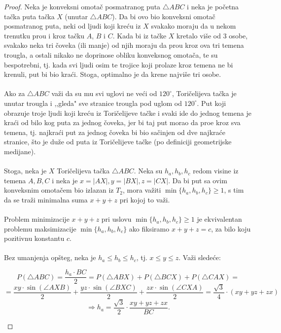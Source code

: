 \documentclass[11pt]{article}
\begin{document}
\begin{proof}
Neka je konveksni omota\v c posmatranog puta $\bigtriangleup ABC$ i neka je po\v cetna ta\v cka puta ta\v cka $X$ (unutar $\bigtriangleup ABC$). Da bi ovo bio konveksni omota\v c posmatranog puta, neki od ljudi koji kre\' cu iz $X$ svakako moraju da u nekom trenutku pro\dj u i kroz ta\v cku $A$, $B$ i $C$. Kada bi iz ta\v cke $X$ kretalo vi\v se od 3 osobe, svakako neka tri \v coveka (ili manje) od njih moraju da pro\dj u kroz ova tri temena trougla, a ostali nikako ne doprinose obliku konveksnog omota\v ca, te su bespotrebni, tj. kada svi ljudi osim te trojice koji prolaze kroz temena ne bi krenuli, put bi bio kra\' ci. Stoga, optimalno je da krene najvi\v se tri osobe. 
\\
\\
\indent Ako za $\bigtriangleup ABC$ va\v zi da su mu svi uglovi ne ve\' ci od $120^\circ$, Tori\v celijeva ta\v cka je unutar trougla i ,,gleda" sve stranice trougla pod uglom od $120^\circ$. Put koji obrazuje troje ljudi koji kre\' cu iz Tori\v celijeve ta\v cke i svaki ide do jednog temena je kra\' ci od bilo kog puta za jednog \v coveka, jer bi taj put morao da pro\dj e kroz sva temena, tj. najkra\' ci put za jednog \v coveka bi bio sa\v cinjen od dve najkra\' ce stranice, \v sto je du\v ze od puta iz Tori\v celijeve ta\v cke (po definiciji geometrijske medijane).
\\
\\
\indent Stoga, neka je $X$ Tori\v celijeva ta\v cka $\bigtriangleup ABC$. Neka su $h_a, h_b, h_c$ redom visine iz temena $A, B, C$ i neka je $x=|AX|, y=|BX|, z=|CX|$. Da bi put sa ovim konveksnim omota\v cem bio izlazan iz $T_2$, mora va\v ziti $\min{\{h_a,h_b,h_c\}}\geqslant 1$, s tim da se tra\v zi minimalna suma $x+y+z$ pri kojoj to va\v zi.
\\
\\
\indent Problem minimizacije $x+y+z$ pri uslovu $\min{\{h_a,h_b,h_c\}}\geqslant 1$ je ekvivalentan problemu maksimizacije $\min{\{h_a,h_b,h_c\}}$ ako fiksiramo $x+y+z=c$, za bilo koju pozitivnu konstantu $c$.
\\
\\
\indent Bez umanjenja op\v steg, neka je $h_a\leqslant h_b\leqslant h_c$, tj. $x\leqslant y\leqslant z$. Va\v zi slede\' ce:
\begin{center}
$$P(\bigtriangleup ABC)=\frac{h_a\cdot BC}{2}=P(\bigtriangleup ABX)+P(\bigtriangleup BCX)+P(\bigtriangleup CAX)=$$
$$=\frac{xy\cdot \sin{(\angle AXB)}}{2}+\frac{yz\cdot \sin{(\angle BXC)}}{2}+\frac{zx\cdot \sin(\angle CXA)}{2}=\frac{\sqrt3}{4}\cdot(xy+yz+zx)$$
$$\Longrightarrow h_a=\frac{\sqrt3}{2}\cdot \frac{xy+yz+zx}{BC}.$$
\end{center}
\end{proof} 
\smallskip
\end{document}
